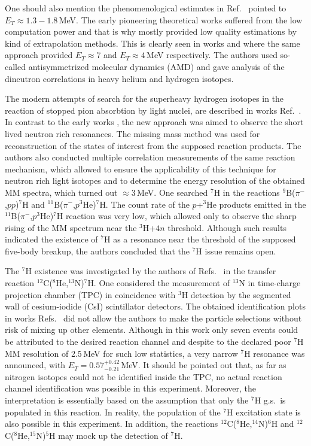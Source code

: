 One should also mention the phenomenological estimates in Ref.\ \cite{Golovkov:2004} pointed to $E_{T} \approx 1.3-1.8$\,MeV.
The early pioneering theoretical works suffered from the low computation power and that is why mostly provided low quality estimations by kind of extrapolation methods.
This is clearly seen in works \cite{Aoyama:2004} and \cite{Aoyama:2009} where the same approach provided $E_{T} \approx 7$ and $E_{T} \approx 4$\,MeV respectively.
The authors used so-called antisymmetrized molecular dynamics (AMD) and gave analysis of the dineutron correlations in heavy helium and hydrogen isotopes.

The modern attempts of search for the superheavy hydrogen isotopes in the reaction of stopped pion absorbtion by light nuclei, are described in works Ref.\ \cite{Gurov:2007,Gurov:2009}.
In contrast to the early works \cite{Seth:1981,Evseev:1981}, the new approach was aimed to observe the short lived neutron rich resonances.
The missing mass method was used for reconstruction of the states of interest from the supposed reaction products.
The authors also conducted multiple correlation measurements of the same reaction mechanism, which allowed to ensure the applicability of this technique for neutron rich light isotopes and to determine the energy resolution of the obtained MM spectra, which turned out $\approx 3$\,MeV.
One searched $^7$H in the reactions $^{9}$B($\pi^-$,$p$$p$)$^7$H and $^{11}$B($\pi^-$,$p^3$He)$^7$H.
The count rate of the $p$+$^3$He products emitted in the $^{11}$B($\pi^-$,$p^3$He)$^7$H reaction was very low, which allowed only to observe the sharp rising of the MM spectrum near the $^3$H+$4n$ threshold.
Although such results indicated the existence of $^7$H as a resonance near the threshold of the supposed five-body breakup, the authors concluded that the $^{7}$H issue remains open.

The $^{7}$H existence was investigated by the authors of Refs.\ \cite{Caamano:2007,Caamano:2008} in the transfer reaction $^{12}$C($^{8}$He,$^{13}$N)$^{7}$H.
One considered the measurement of $^{13}$N in time-charge projection chamber (TPC) in coincidence with $^{3}$H detection by the segmented wall of cesium-iodide (CsI) scintillator detectors.
The obtained identification plots in works Refs.\ \cite{Caamano:2007,Caamano:2008} did not allow the authors to make the particle selections without risk of mixing up other elements.
Although in this work only seven events could be attributed to the desired reaction channel and despite to the declared poor $^{7}$H MM resolution of 2.5\,MeV for such low statistics, a very narrow $^7$H resonance was announced, with $E_T= 0.57^{+0.42}_{-0.21}$\,MeV.
It should be pointed out that, as far as nitrogen isotopes could not be identified inside the TPC, no actual reaction channel identification was possible in this experiment.
Moreover, the interpretation is essentially based on the assumption that only the $^{7}$H g.s.\ is populated in this reaction.
In reality, the population of the $^{7}$H excitation state is also possible in this experiment.
In addition, the reactions $^{12}$C($^{8}$He,$^{14}$N)$^{6}$H and $^{12}$C($^{8}$He,$^{15}$N)$^{5}$H may mock up the detection of $^{7}$H.

